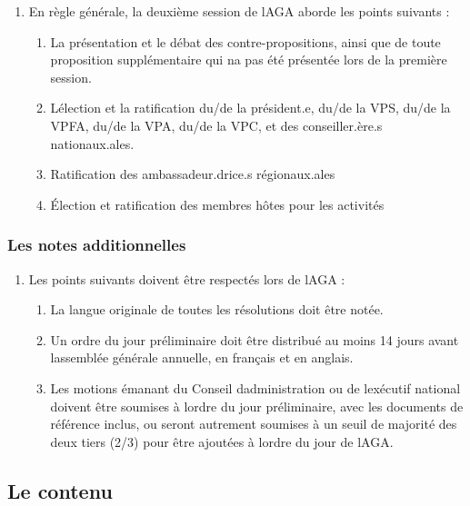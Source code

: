 \begin{enumerate}
 \item
  En règle générale, la deuxième session de l\textquotesingle AGA aborde les points suivants :

  \begin{enumerate}
   \item
    La présentation et le débat des contre-propositions, ainsi que de toute proposition supplémentaire qui n\textquotesingle a pas été présentée lors de la première session.
   \item
    L\textquotesingle élection et la ratification du/de la président.e, du/de la VPS, du/de la VPFA, du/de la VPA, du/de la VPC, et des conseiller.ère.s nationaux.ales.
   \item
    Ratification des ambassadeur.drice.s régionaux.ales
   \item
    Élection et ratification des membres hôtes pour les activités
  \end{enumerate}
\end{enumerate}

\subsubsection{Les notes additionnelles}
\label{les-notes-additionnelles}

\begin{enumerate}
 \item
  Les points suivants doivent être respectés lors de l\textquotesingle AGA :

  \begin{enumerate}
   \item
    La langue originale de toutes les résolutions doit être notée.
   \item
    Un ordre du jour préliminaire doit être distribué au moins 14 jours avant l\textquotesingle assemblée générale annuelle, en français et en anglais.
   \item
    Les motions émanant du Conseil d\textquotesingle administration ou de l\textquotesingle exécutif national doivent être soumises à l\textquotesingle ordre du jour préliminaire, avec les documents de référence inclus, ou seront autrement soumises à un seuil de majorité des deux tiers (2/3) pour être ajoutées à l\textquotesingle ordre du jour de l\textquotesingle AGA.
  \end{enumerate}
\end{enumerate}

\subsection{Le contenu}
\label{le-contenu}

